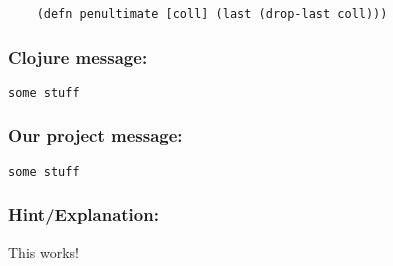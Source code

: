 \documentclass[12pt]{article}
\begin{document}
\begin{verbatim}
	(defn penultimate [coll] (last (drop-last coll)))
\end{verbatim}

{\addtolength{\leftskip}{10mm}

	\subsubsection*{Clojure message:}
	
	\verb|some stuff|

	\subsubsection*{Our project message:}
	
	\verb|some stuff|
	
	\subsubsection*{Hint/Explanation:}
	
This works!

}

\end{document}
